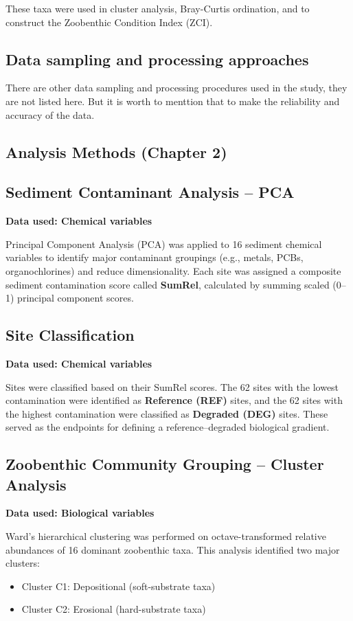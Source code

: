 \bigskip
\noindent These taxa were used in cluster analysis, Bray-Curtis ordination, and to construct the Zoobenthic Condition Index (ZCI).

\subsection*{Data sampling and processing approaches}
There are other data sampling and processing procedures used in the study, they are not listed here. But it is worth to menttion that 
to make the reliability and accuracy of the data.

\subsection{Analysis Methods (Chapter 2)}

\subsection*{Sediment Contaminant Analysis – PCA}
\textbf{Data used: Chemical variables}

Principal Component Analysis (PCA) was applied to 16 sediment chemical variables to identify major contaminant groupings (e.g., metals, PCBs, organochlorines) and reduce dimensionality. Each site was assigned a composite sediment contamination score called \textbf{SumRel}, calculated by summing scaled (0–1) principal component scores.

\subsection*{Site Classification}
\textbf{Data used: Chemical variables}

Sites were classified based on their SumRel scores. The 62 sites with the lowest contamination were identified as \textbf{Reference (REF)} sites, and the 62 sites with the highest contamination were classified as \textbf{Degraded (DEG)} sites. These served as the endpoints for defining a reference–degraded biological gradient.

\subsection*{Zoobenthic Community Grouping – Cluster Analysis}
\textbf{Data used: Biological variables}

Ward’s hierarchical clustering was performed on octave-transformed relative abundances of 16 dominant zoobenthic taxa. This analysis identified two major clusters:
\begin{itemize}
    \item Cluster C1: Depositional (soft-substrate taxa)
    \item Cluster C2: Erosional (hard-substrate taxa)
\end{itemize}

